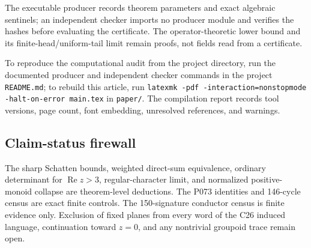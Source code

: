 The executable producer records theorem parameters and exact algebraic
sentinels; an independent checker imports no producer module and verifies
the hashes before evaluating the certificate.  The operator-theoretic
lower bound and its finite-head/uniform-tail limit remain proofs, not fields
read from a certificate.

To reproduce the computational audit from the project directory, run the
documented producer and independent checker commands in the project
\texttt{README.md}; to rebuild this article, run
\texttt{latexmk -pdf -interaction=nonstopmode -halt-on-error main.tex} in
\texttt{paper/}.  The compilation report records tool versions, page count,
font embedding, unresolved references, and warnings.

\subsection{Claim-status firewall}

The sharp Schatten bounds, weighted direct-sum equivalence, ordinary
determinant for \(\operatorname{Re}z>3\), regular-character limit, and
normalized positive-monoid collapse are theorem-level deductions.  The
P073 identities and 146-cycle census are exact finite controls.  The
150-signature conductor census is finite evidence only.  Exclusion of fixed
planes from every word of the C26 induced language, continuation toward
\(z=0\), and any nontrivial groupoid trace remain open.
